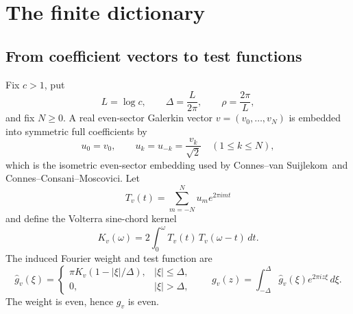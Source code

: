 \documentclass[11pt]{article}
\theoremstyle{plain}
\theoremstyle{definition}
\theoremstyle{remark}
\newcommand{\cvs}{Connes--van Suijlekom}
\newcommand{\ccm}{Connes--Consani--Moscovici}
\newcommand{\wh}{\widehat}
\newcommand{\dd}{\,d}
\begin{document}
\section{The finite dictionary}\label{sec:dictionary}

\subsection{From coefficient vectors to test functions}

Fix $c>1$, put
\[
        L=\log c,\qquad \Delta=\frac{L}{2\pi},\qquad \rho=\frac{2\pi}{L},
\]
and fix $N\ge0$.  A real even-sector Galerkin vector
$v=(v_0,\ldots,v_N)$ is embedded into symmetric full coefficients by
\[
        u_0=v_0,\qquad u_k=u_{-k}=\frac{v_k}{\sqrt2}\quad(1\le k\le N),
\]
which is the isometric even-sector embedding used by \cvs\ and \ccm.  Let
\[
        T_v(t)=\sum_{m=-N}^{N}u_m e^{2\pi i mt}
\]
and define the Volterra sine-chord kernel
\[
        K_v(\omega)=2\int_0^\omega T_v(t)\,T_v(\omega-t)\dd t.
\]
The induced Fourier weight and test function are
\[
        \wh g_v(\xi)=
        \begin{cases}
        \pi K_v(1-|\xi|/\Delta),& |\xi|\le \Delta,\\
        0,& |\xi|>\Delta,
        \end{cases}
\qquad
        g_v(z)=\int_{-\Delta}^{\Delta}\wh g_v(\xi)e^{2\pi iz\xi}\dd\xi .
\]
The weight is even, hence $g_v$ is even.
\end{document}

